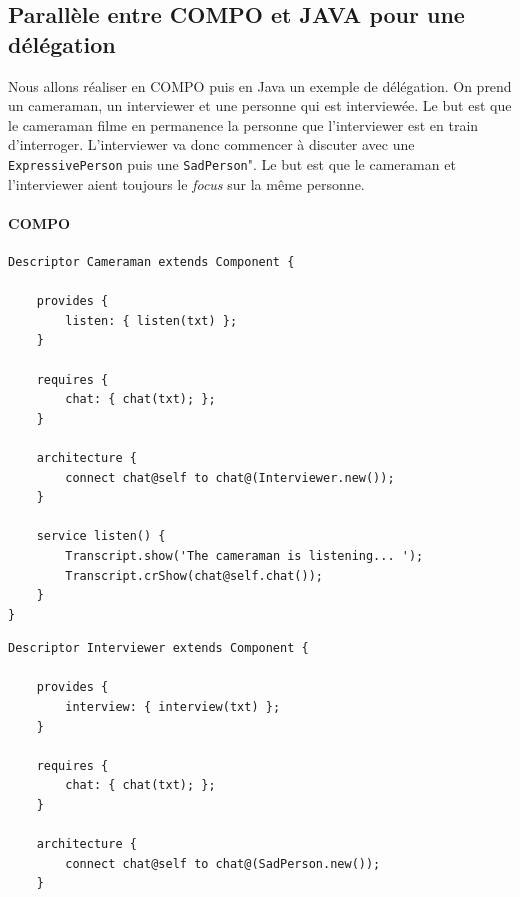 \documentclass[11pt,a4paper,openany,oneside]{book}
\begin{document}


\begin{appendices}
\appendixpage
\noappendicestocpagenum
\addappheadtotoc

\chapter{Parallèle entre COMPO et JAVA pour une délégation}


\label{Annexe A}

Nous allons réaliser en COMPO puis en Java un exemple de délégation. On prend un cameraman, un interviewer et une personne qui est interviewée. Le but est que le cameraman filme en permanence la personne que l'interviewer est en train d'interroger. L'interviewer va donc commencer à discuter avec une \texttt{ExpressivePerson} puis une \texttt{SadPerson}". Le but est que le cameraman et l'interviewer aient toujours le \textit{focus} sur la même personne.

\subsubsection{COMPO}
\begin{lstlisting}[language=Compo, frame=single, caption=Cameraman]
Descriptor Cameraman extends Component {

    provides {
        listen: { listen(txt) };
    }
    
    requires {
        chat: { chat(txt); };
    }
    
    architecture {
        connect chat@self to chat@(Interviewer.new());
    }
    
    service listen() {
        Transcript.show('The cameraman is listening... ');
        Transcript.crShow(chat@self.chat());
    }
}
\end{lstlisting}

\newpage

\begin{lstlisting}[language=Compo, frame=single, caption=Interviewer]
Descriptor Interviewer extends Component {

    provides {
        interview: { interview(txt) };
    }
    
    requires {
        chat: { chat(txt); };
    }
    
    architecture {
        connect chat@self to chat@(SadPerson.new());
    }
    

\end{lstlisting}
\end{appendices}
\end{document}

